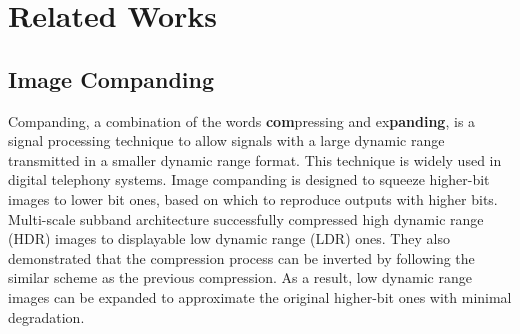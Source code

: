 \documentclass[journal]{IEEEtran}
\begin{document}





\section{Related Works}

\subsection{Image Companding}
Companding, a combination of the words \textbf{com}pressing and ex\textbf{panding}, is a signal processing technique to allow signals with a large dynamic range transmitted in a smaller dynamic range format. This technique is widely used in digital telephony systems. Image companding \cite{yang2004integer,bhooshan20102d,li2005compressing} is designed to squeeze higher-bit images to lower bit ones, based on which to reproduce outputs with higher bits. Multi-scale subband architecture \cite{li2005compressing} successfully compressed high dynamic range (HDR) images to displayable low dynamic range (LDR) ones. They also demonstrated that the compression process can be inverted by following the similar scheme as the previous compression. As a result, low dynamic range images can be expanded to approximate the original higher-bit ones with minimal degradation.
\end{document}
